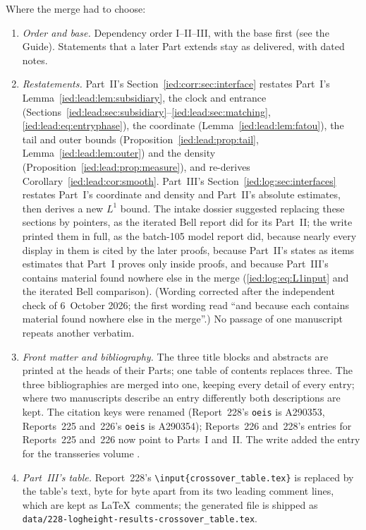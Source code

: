 \documentclass[11pt,letterpaper]{article}
\theoremstyle{remark}\newtheorem{remark}[theorem]{Remark}
\newcommand{\file}[1]{\nolinkurl{#1}}
\begin{document}
Where the merge had to choose:
\begin{enumerate}
\item \emph{Order and base.} Dependency order I--II--III, with the base first (see the Guide). Statements that a later Part extends stay as delivered, with dated notes.
\item \emph{Restatements.} Part~II's Section~\ref{ied:corr:sec:interface} restates Part~I's Lemma~\ref{ied:lead:lem:subsidiary}, the clock and entrance (Sections~\ref{ied:lead:sec:subsidiary}--\ref{ied:lead:sec:matching}, \eqref{ied:lead:eq:entryphase}), the coordinate (Lemma~\ref{ied:lead:lem:fatou}), the tail and outer bounds (Proposition~\ref{ied:lead:prop:tail}, Lemma~\ref{ied:lead:lem:outer}) and the density (Proposition~\ref{ied:lead:prop:measure}), and re-derives Corollary~\ref{ied:lead:cor:smooth}. Part~III's Section~\ref{ied:log:sec:interfaces} restates Part~I's coordinate and density and Part~II's absolute estimates, then derives a new $L^1$ bound. The intake dossier suggested replacing these sections by pointers, as the iterated Bell report did for its Part~II; the write printed them in full, as the batch-105 model report did, because nearly every display in them is cited by the later proofs, because Part~II's states as items estimates that Part~I proves only inside proofs, and because Part~III's contains material found nowhere else in the merge (\eqref{ied:log:eq:L1input} and the iterated Bell comparison). \textup{(Wording corrected after the independent check of 6~October 2026; the first wording read ``and because each contains material found nowhere else in the merge''.)} No passage of one manuscript repeats another verbatim.
\item \emph{Front matter and bibliography.} The three title blocks and abstracts are printed at the heads of their Parts; one table of contents replaces three. The three bibliographies are merged into one, keeping every detail of every entry; where two manuscripts describe an entry differently both descriptions are kept. The citation keys were renamed (Report~228's \texttt{oeis} is A290353, Reports~225 and~226's \texttt{oeis} is A290354); Reports~226 and~228's entries for Reports~225 and~226 now point to Parts~I and~II. The write added the entry for the transseries volume \cite{TSvol}.
\item \emph{Part~III's table.} Report~228's \texttt{\textbackslash input\{crossover\_table.tex\}} is replaced by the table's text, byte for byte apart from its two leading comment lines, which are kept as \LaTeX\ comments; the generated file is shipped as \file{data/228-logheight-results-crossover_table.tex}.

\end{enumerate}
\end{document}
